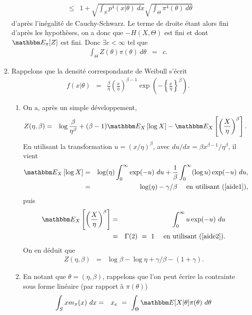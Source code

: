\begin{enumerate}
\begin{eqnarray*}
& \leq & 1 + \sqrt{\int_S p^4(x|\theta) \ dx}\sqrt{\int_{\Theta} \pi^4(\theta) \ d\theta}
\end{eqnarray*}
d'après l'inégalité de  Cauchy-Schwarz. Le terme de droite étant alors fini d'après les hypothèses, on a donc que $-H(X,\Theta)$ est fini et dont $\E_{\pi}[Z] $ est fini. Donc $\exists c<\infty$ tel que 
\begin{eqnarray*}
\int_{\Theta} Z(\theta) \pi(\theta) \ d\theta & = & c.
\end{eqnarray*}
\item Rappelons que la densité correspondante de Weibull s'écrit
\begin{eqnarray*}
f(x|\theta) & = & \frac{\beta}{\eta} \left(\frac{x}{\eta}\right)^{\beta-1} \exp\left(-\left\{\frac{x}{\eta}\right\}^{\beta}\right).
\end{eqnarray*}
\begin{enumerate}
\item On a, après un simple développement,
\begin{eqnarray*}
Z(\eta,\beta) & = & \log \frac{\beta}{\eta^{\beta}} + (\beta-1) \E_X\left[\log X\right] -  \E_X\left[\left(\frac{X}{\eta}\right)^{\beta}\right]. 
\end{eqnarray*}
En utilisant la transformation $u=(x/\eta)^{\beta}$, avec $du/dx = \beta x^{\beta-1}/\eta^{\beta}$, il vient
\begin{eqnarray*}
\E_X\left[\log X\right] & = & \log(\eta) \int_{0}^{\infty} \exp(-u) \ du + \frac{1}{\beta} \int_{0}^{\infty} (\log u)  \exp(-u) \ du, \\
& = &  \log(\eta) - \gamma/\beta \ \ \ \ \text{en utilisant (\ref{aide1})},
\end{eqnarray*}
puis
\begin{eqnarray*}
\E_X\left[\left(\frac{X}{\eta}\right)^{\beta}\right] & = &  \int_{0}^{\infty} u \exp(-u) \ du  \\
& = &  \Gamma(2) \ = \ 1 \ \ \ \ \text{en utilisant (\ref{aide2})}.
\end{eqnarray*}
On en déduit que
\begin{eqnarray*}
Z(\eta,\beta) & = & \log \beta - \log \eta + \gamma/\beta - (1+\gamma). 
\end{eqnarray*}
\item En notant que $\theta=(\eta,\beta)$, rappelons que l'on peut écrire la contrainte sous forme linéaire (par rapport à $\pi(\theta)$)
\begin{eqnarray}
\int_S x m_{\pi}(x) \ dx & = & x_e \ = \ \int_{\Theta} \E[X|\theta] \pi(\theta)  \ d\theta \label{mean1}

\end{eqnarray}
\end{enumerate}
\end{enumerate}
